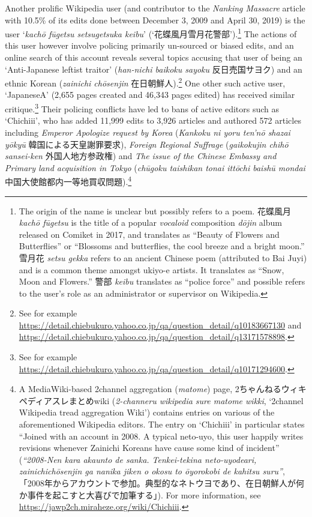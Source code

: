 \documentclass[10pt,british,A4paper,,openany]{memoir}
\begin{document}
Another prolific Wikipedia user (and contributor to the \emph{Nanking
Massacre} article with 10.5\% of its edits done between December 3, 2009
and April 30, 2019) is the user `\emph{kachō fūgetsu setsugetsuka
keibu}' (`花蝶風月雪月花警部').\footnote{The origin of the name is
  unclear but possibly refers to a poem. 花蝶風月 \emph{kachō fūgetsu}
  is the title of a popular \emph{vocaloid} composition \emph{dōjin}
  album released on Comiket in 2017, and translates as ``Beauty of
  Flowers and Butterflies'' or ``Blossoms and butterflies, the cool
  breeze and a bright moon.'' 雪月花 \emph{setsu gekka} refers to an
  ancient Chinese poem (attributed to Bai Juyi) and is a common theme
  amongst ukiyo-e artists. It translates as ``Snow, Moon and Flowers.''
  警部 \emph{keibu} translates as ``police force'' and possible refers
  to the user's role as an administrator or supervisor on Wikipedia.}
The actions of this user however involve policing primarily un-sourced
or biased edits, and an online search of this account reveals several
topics accusing that user of being an `Anti-Japanese leftist traitor'
(\emph{han-nichi baikoku sayoku} 反日売国サヨク) and an ethnic Korean
(\emph{zainichi chōsenjin} 在日朝鮮人).\footnote{See for example
  \url{https://detail.chiebukuro.yahoo.co.jp/qa/question_detail/q10183667130}
  and
  \url{https://detail.chiebukuro.yahoo.co.jp/qa/question_detail/q13171578898}.}
One other such active user, `JapaneseA' (2,655 pages created and 46,343
pages edited) has received similar critique.\footnote{See for example
  \url{https://detail.chiebukuro.yahoo.co.jp/qa/question_detail/q10171294600}.}
Their policing conflicts have led to bans of active editors such as
`Chichiii', who has added 11,999 edits to 3,926 articles and authored
572 articles including \emph{Emperor Apologize request by Korea}
(\emph{Kankoku ni yoru ten'nō shazai yōkyū} 韓国による天皇謝罪要求),
\emph{Foreign Regional Suffrage} (\emph{gaikokujin chihō sansei-ken}
外国人地方参政権) and \emph{The issue of the Chinese Embassy and Primary
land acquisition in Tokyo} (\emph{chūgoku taishikan tonai ittōchi baishū
mondai} 中国大使館都内一等地買収問題).\footnote{A MediaWiki-based
  2channel aggregation (\emph{matome}) page,
  2ちゃんねるウィキペディアスレまとめwiki (\emph{2-channeru wikipedia
  sure matome wikki}, `2channel Wikipedia tread aggregation Wiki')
  contains entries on various of the aforementioned Wikipedia editors.
  The entry on `Chichiii' in particular states ``Joined with an account
  in 2008. A typical neto-uyo, this user happily writes revisions
  whenever Zainichi Koreans have cause some kind of incident''
  (\emph{``2008-Nen kara akaunto de sanka. Tenkei-tekina neto-uyodeari,
  zainichichōsenjin ga nanika jiken o okosu to ōyorokobi de kahitsu
  suru''},
  「2008年からアカウントで参加。典型的なネトウヨであり、在日朝鮮人が何か事件を起こすと大喜びで加筆する」).
  For more information, see
  \url{https://jawp2ch.miraheze.org/wiki/Chichiii}.}
\end{document}
